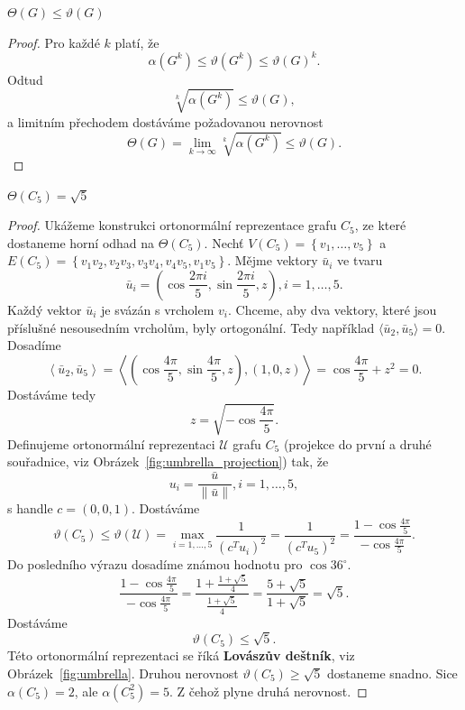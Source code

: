 \begin{lm}\cite{lovasz}
    $\Theta(G) \leq \vartheta(G)$
\end{lm}

\begin{proof}
    Pro každé $k$ platí, že
    $$
        \alpha(G^k) \leq \vartheta(G^k) \leq \vartheta(G)^k.
    $$
    Odtud
    $$
        \sqrt[k]{\alpha(G^k)} \leq \vartheta(G),
    $$
    a limitním přechodem dostáváme požadovanou nerovnost
    $$
        \Theta(G) = \lim_{k \to \infty} \sqrt[k]{\alpha(G^k)} \leq \vartheta(G).
    $$
\end{proof}

\begin{vt}\cite{lovasz}
    $\Theta(C_5) = \sqrt{5}$
\end{vt}

\begin{proof}
    Ukážeme konstrukci ortonormální reprezentace grafu $C_5$, ze které dostaneme horní odhad na $\Theta(C_5)$. Nechť $V(C_5) = \left\{ v_1, \dots, v_5 \right\}$ a $E(C_5) = \left\{ v_1v_2, v_2v_3, v_3v_4, v_4v_5, v_1v_5 \right\}$. Mějme vektory $\bar{u}_i$ ve tvaru
    $$
        \bar{u}_i = \left( \cos\frac{2 \pi i}{5}, \sin \frac{2 \pi i}{5}, z \right), i = 1, \dots, 5.
    $$
    Každý vektor $\bar{u}_i$ je svázán s vrcholem $v_i$. Chceme, aby dva vektory, které jsou příslušné nesousedním vrcholům, byly ortogonální. Tedy například $\langle \bar{u}_2, \bar{u}_5 \rangle = 0$. Dosadíme
    $$
        \left\langle \bar{u}_2, \bar{u}_5 \right\rangle = 
        \left\langle ( \cos\frac{4\pi}{5}, \sin\frac{4\pi}{5}, z ), \left( 1, 0, z \right) \right\rangle =
        \cos\frac{4\pi}{5} + z^2 = 0.
    $$
    Dostáváme tedy
    $$
        z = \sqrt{-\cos\frac{4\pi}{5}}.
    $$
    Definujeme ortonormální reprezentaci $\mathcal{U}$ grafu $C_5$ (projekce do první a druhé souřadnice, viz Obrázek~\ref{fig:umbrella_projection}) tak, že
    $$
        u_i = \frac{\bar{u}}{\| \bar{u} \|}, i = 1, \dots, 5,
    $$
    s handle $c = \left( 0, 0, 1 \right)$.
    Dostáváme
    $$
        \vartheta(C_5) \leq \vartheta(\mathcal{U}) = \max_{i = 1, \dots, 5} \frac{1}{(c^T u_i)^2} = \frac{1}{( c^T u_5)^2} = \frac{1 - \cos\frac{4\pi}{5}}{-\cos\frac{4\pi}{5}}.
    $$
    Do posledního výrazu dosadíme známou hodnotu pro $\cos 36^{\circ}$.
    $$
        \frac{1 - \cos\frac{4\pi}{5}}{-\cos\frac{4\pi}{5}} = \frac{1 + \frac{1 + \sqrt{5}}{4}}{\frac{1 + \sqrt{5}}{4}} = \frac{5 + \sqrt{5}}{1 + \sqrt{5}} = \sqrt{5}.
    $$
    Dostáváme
    $$
        \vartheta(C_5) \leq \sqrt{5}.
    $$
    Této ortonormální reprezentaci se říká \textbf{Lovászův deštník}, viz Obrázek~\ref{fig:umbrella}. Druhou nerovnost $\vartheta(C_5) \geq \sqrt{5}$ dostaneme snadno. Sice $\alpha(C_5) = 2$, ale $\alpha(C_5^2) = 5$. Z čehož plyne druhá nerovnost.
\end{proof}

